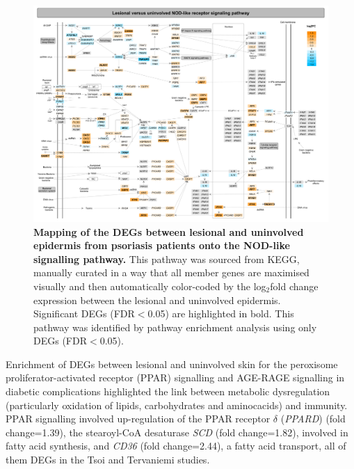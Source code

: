 \begin{landscape}
\begin{figure}[htbp]
\centering
\includegraphics[width=\textwidth]{./Results2/pdfs/PS_lesional_uninvolved_all_NOD_like_pathway}
\caption[Mapping of the DEGs between lesional and uninvolved epidermis from psoriasis patients onto the NOD-like signalling pathway.]{\textbf{Mapping of the DEGs between lesional and uninvolved epidermis from psoriasis patients onto the NOD-like signalling pathway.} This pathway was sourced from KEGG, manually curated in a way that all member genes are maximised visually and then automatically color-coded by the log$_2$fold change expression between the lesional and uninvolved epidermis. Significant DEGs (FDR$<$0.05) are highlighted in bold. This pathway was identified by pathway enrichment analysis using only DEGs (FDR$<$0.05).}
\label{figure:PS_lesional_vs_uninvolved_NOD_pathway}
\end{figure}
\end{landscape}


\noindent Enrichment of DEGs between lesional and uninvolved skin for the peroxisome proliferator-activated receptor (PPAR) signalling and AGE-RAGE signalling in diabetic complications highlighted the link between metabolic dysregulation (particularly oxidation of lipids, carbohydrates and aminocacids) and immunity. PPAR signalling involved up-regulation of the PPAR receptor $\delta$ (\textit{PPARD}) (fold change=1.39), the stearoyl-CoA desaturase \textit{SCD} (fold change=1.82), involved in fatty acid synthesis, and \textit{CD36} (fold change=2.44), a fatty acid transport, all of them DEGs in the Tsoi and Tervaniemi studies.


